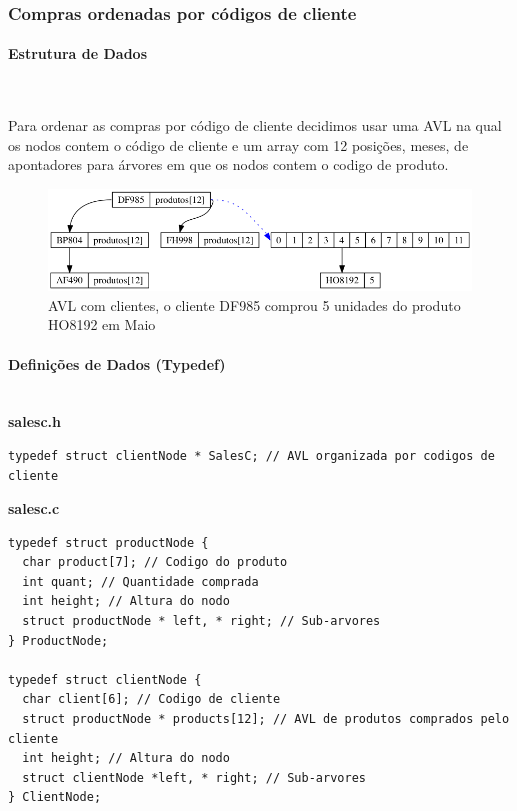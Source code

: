 \documentclass[10pt] {article}
\begin{document}
\newpage
\subsubsection{Compras ordenadas por códigos de cliente}
\paragraph{Estrutura de Dados}\mbox{}\\
\indent\par Para ordenar as compras por código de cliente decidimos usar uma AVL na qual os nodos contem 
o código de cliente e um array com 12 posições, meses, de apontadores para árvores em que os nodos 
contem o codigo de produto.

\begin{figure}[ht!]
\centering
\includegraphics[width=120mm]{avl_salesc.png}
\caption{AVL com clientes, o cliente DF985 comprou 5 unidades do produto HO8192 em Maio}
\end{figure}

\paragraph{Definições de Dados (Typedef)}\mbox{}\\
\textbf{salesc.h}
\begin{lstlisting}
typedef struct clientNode * SalesC; // AVL organizada por codigos de cliente
\end{lstlisting}
\textbf{salesc.c}
\begin{lstlisting}
typedef struct productNode {
  char product[7]; // Codigo do produto
  int quant; // Quantidade comprada
  int height; // Altura do nodo
  struct productNode * left, * right; // Sub-arvores
} ProductNode;

typedef struct clientNode {
  char client[6]; // Codigo de cliente
  struct productNode * products[12]; // AVL de produtos comprados pelo cliente
  int height; // Altura do nodo
  struct clientNode *left, * right; // Sub-arvores
} ClientNode;
\end{lstlisting}
\end{document}
